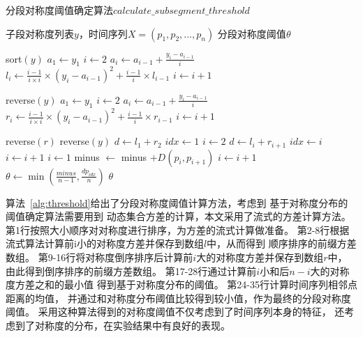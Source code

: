 \begin{algorithm}[t]
  \caption{分段对称度阈值确定算法$calculate\_subsegment\_threshold$}
  \label{alg:threshold}
  \small
  \begin{algorithmic}
    \REQUIRE 子段对称度列表$y$，时间序列$X=\left(p_{1}, p_{2}, \dots, p_{n}\right)$
    \ENSURE 分段对称度阈值$\theta$

    \STATE sort$(y)$
    \STATE $a_1 \leftarrow y_1$
    \STATE $i \leftarrow 2$
    \STATE $a_i \leftarrow a_{i-1}+\frac{y_i-a_{i-1}}{i}$
    \STATE $l_i \leftarrow \frac{i-1}{i \times i} \times(y_i-a_{i-1})^{2}+\frac{i-1}{i} \times l_{i-1}$
    \STATE $i \leftarrow i+1$
    \ENDWHILE

    \STATE reverse$(y)$
    \STATE $a_1 \leftarrow y_1$
    \STATE $i \leftarrow 2$
    \STATE $a_i \leftarrow a_{i-1}+\frac{y_i-a_{i-1}}{i}$
    \STATE $r_i \leftarrow \frac{i-1}{i \times i} \times (y_i-a_{i-1})^{2}+\frac{i-1}{i} \times r_{i-1}$
    \STATE $i \leftarrow i+1$
    \ENDWHILE

    \STATE reverse$(r)$
    \STATE reverse$(y)$
    \STATE $d \leftarrow l_1 + r_2$
    \STATE $idx \leftarrow 1$
    \STATE $i \leftarrow 2$
    \STATE $d \leftarrow l_i + r_{i+1}$
    \STATE $idx \leftarrow i$
    \ENDIF
    \STATE $i \leftarrow i+1$
    \ENDWHILE
    \STATE $i \leftarrow 1$
    \STATE minus $\leftarrow$ minus $+D\left(p_{i}, p_{i+1}\right)$
    \STATE $i \leftarrow i+1$
    \ENDWHILE
    \STATE $\theta \leftarrow \min \left(\frac{minus}{n-1}, \frac{dp_{idx}}{n}\right)$
    \RETURN $\theta$
  \end{algorithmic}
\end{algorithm}

算法~\ref{alg:threshold}给出了分段对称度阈值计算方法，考虑到
基于对称度分布的阈值确定算法需要用到
动态集合方差的计算，本文采用了流式的方差计算方法。
第1行按照大小顺序对对称度进行排序，为方差的流式计算做准备。
第2-8行根据流式算法计算前i小的对称度方差并保存到数组$l$中，从而得到
顺序排序的前缀方差数组。
第9-16行将对称度倒序排序后计算前$i$大的对称度方差并保存到数组$r$中，
由此得到倒序排序的前缀方差数组。
第17-28行通过计算前$i$小和后$n-i$大的对称度方差之和的最小值
得到基于对称度分布的阈值。
第24-35行计算时间序列相邻点距离的均值，
并通过和对称度分布阈值比较得到较小值，作为最终的分段对称度阈值。
采用这种算法得到的对称度阈值不仅考虑到了时间序列本身的特征，
还考虑到了对称度的分布，在实验结果中有良好的表现。


